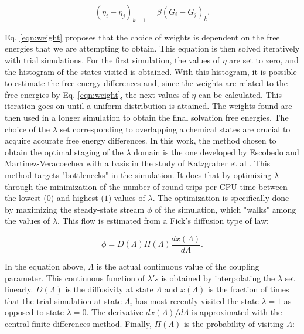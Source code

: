 \documentclass[final,12p,times,twocolumn]{elsarticle}
\begin{document}
	\begin{equation}
	\label{eqn:weight}
	(\eta_{i} - \eta_{j})_{k+1} = \beta(G_i-G_j)_{k} .
	\end{equation}
	
	Eq. \ref{eqn:weight} proposes that the choice of weights is dependent on the free energies that we are attempting to obtain. This equation is then solved iteratively with trial simulations. For the first simulation, the values of $\eta$ are set to zero, and the histogram of the states visited is obtained. With this histogram, it is possible to estimate the free energy differences and, since the weights are related to the free energies by Eq. \ref{eqn:weight}, the next values of $\eta$ can be calculated. This iteration goes on until a uniform distribution is attained. The weights found are then used in a longer simulation to obtain the final solvation free energies. The choice of the $\lambda$ set corresponding to overlapping alchemical states are crucial to acquire accurate free energy differences. In this work, the method chosen to obtain the optimal staging of the $\lambda$ domain is the one developed by Escobedo and Martinez-Veracoechea  \cite{escobedo2007} with a basis in the study of  Katzgraber et al \cite{1742-5468-2006-03-P03018}. This method targets "bottlenecks" in the simulation. It does that by optimizing $\lambda$ through the minimization of the number of round trips per CPU time between the lowest ($0$) and highest ($1$) values of $\lambda$. The optimization is specifically done by maximizing the steady-state stream $\phi$ of the simulation, which "walks" among the values of $\lambda$. This flow is estimated from a Fick's diffusion type of law:
	
	\begin{equation}
	\phi = D(\Lambda) \Pi (\Lambda) \dfrac{dx(\Lambda)}{d \Lambda}.
	\label{eqn:stream}
	\end{equation}
	
	In the equation above, $\Lambda$ is the actual continuous value of the coupling parameter. This continuous function of $\lambda 's$ is obtained by interpolating the $\lambda$ set linearly. $D(\Lambda)$ is the diffusivity at  state $\Lambda$ and $x(\Lambda)$ is the fraction of times that the trial simulation at state $\Lambda_{i}$ has most recently visited the state $\lambda=1$ as opposed to state $\lambda=0$. The derivative ${dx(\Lambda)}/{d \Lambda}$ is approximated with the central finite differences method. Finally, $\Pi (\Lambda)$ is the probability of visiting $\Lambda$:
	
\end{document}
